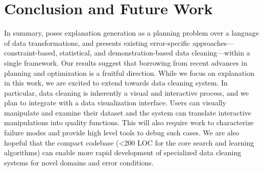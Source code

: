 \section{Conclusion and Future Work}
In summary, \sys poses explanation generation as a planning problem over a language of data transformations, and presents existing error-specific approaches---constraint-based, statistical, and demonstration-based data cleaning---within a single framework.
Our results suggest that borrowing from recent advances in planning and optimization is a fruitful direction.  
While we focus on explanation in this work, we are excited to extend \sys towards data cleaning system.  In particular, data cleaning is inherently a visual and interactive process, and we plan to integrate \sys with a data visualization interface.   Users can visually manipulate and examine their dataset and the system can translate interactive manipulations into quality functions.  This will also require work to characterize failure modes and provide high level tools to debug such cases.  We are also hopeful that the compact codebase (<200 LOC for the core search and learning algorithms) can enable more rapid development of specialized data cleaning systems for novel domains and error conditions.  



% 
% 
